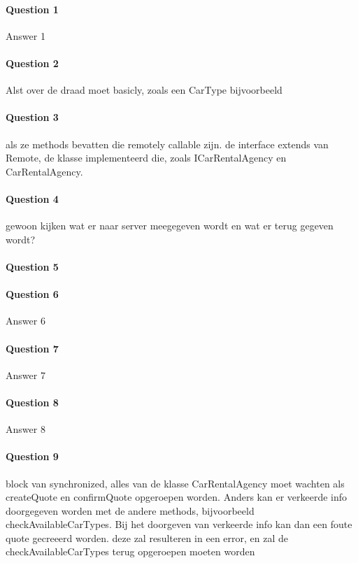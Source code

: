 \documentclass{ds-report}
\begin{document}
	\maketitle

	\paragraph{Question 1} 
	Answer 1
	
	\paragraph{Question 2} 
	Alst over de draad moet basicly, zoals een CarType bijvoorbeeld
	
	\paragraph{Question 3} 
	als ze methods bevatten die remotely callable zijn. de interface extends van Remote, de klasse implementeerd die, zoals ICarRentalAgency en CarRentalAgency.
	
	\paragraph{Question 4} 
	gewoon kijken wat er naar server meegegeven wordt en wat er terug gegeven wordt?
	
	\paragraph{Question 5} 
	
	
	\paragraph{Question 6} 
	Answer 6
	
	\paragraph{Question 7} 
	Answer 7
	
	\paragraph{Question 8} 
	Answer 8
	
	\paragraph{Question 9} 
	block van synchronized, alles van de klasse CarRentalAgency moet wachten als createQuote en confirmQuote opgeroepen worden. 
	Anders kan er verkeerde info doorgegeven worden met de andere methods, bijvoorbeeld checkAvailableCarTypes. 
	Bij het doorgeven van verkeerde info kan dan een foute quote gecreeerd worden. deze zal resulteren in een error, en zal de checkAvailableCarTypes terug
	opgeroepen moeten worden 
	
	\clearpage
	
	
\end{document}
